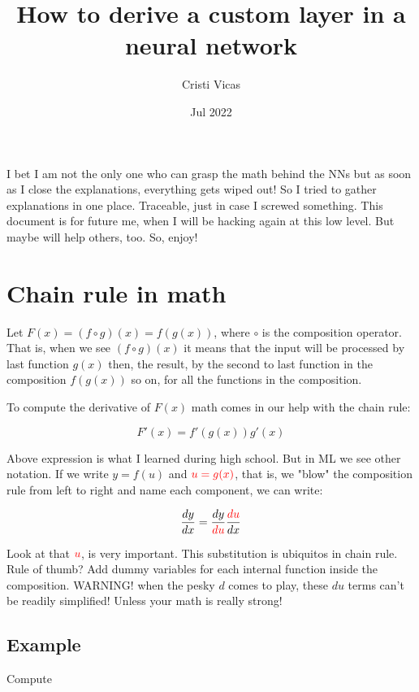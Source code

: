 \documentclass{article}
\title{How to derive a custom layer in a neural network}
\author{Cristi Vicas}
\date{Jul 2022}
\begin{document}
\maketitle


I bet I am not the only one who can grasp the math behind the NNs but as soon as I close the explanations, everything gets wiped out! So I tried to gather explanations in one place. Traceable, just in case I screwed something. This document is for future me, when I will be hacking again at this low level. But maybe will help others, too. So, enjoy!

\section{Chain rule in math}

Let $F(x) = (f \circ g)(x) = f(g(x))$, where $\circ$ is the composition operator. That is, when we see $(f \circ g)(x)$ it means that the input will be processed by last function $g(x)$ then, the result, by the second to last function in the composition $f(g(x))$ so on, for all the functions in the composition.

To compute the derivative of $F(x)$ math comes in our help with the chain rule:

\begin{equation}
	F'(x)=f'(g(x))g'(x)
\end{equation}

Above expression is what I learned during high school. But in ML we see other notation. If we write  $y = f(u)$ and $\textcolor{red}{u = g(x)}$, that is, we "blow" the composition rule from left to right and name each component, we can write:

\begin{equation}
	\frac{dy}{dx} = \frac{dy}{\textcolor{red}{du}}  \frac{\textcolor{red}{du}}{dx} \label{chain_rule}
\end{equation}

Look at that $\textcolor{red}{u}$, is very important. This substitution is ubiquitos in chain rule.\\

Rule of thumb? Add dummy variables for each internal function inside the composition. WARNING! when the pesky $d$ comes to play, these $du$ terms can't be readily simplified! Unless your math is really strong!
 
\subsection{Example}
Compute
\end{document}
